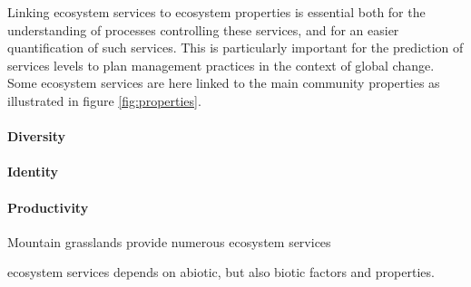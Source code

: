 

Linking ecosystem services to ecosystem properties is essential both for the understanding of processes controlling these services, and for an easier quantification of such services. This is particularly important for the prediction of services levels to plan management practices in the context of global change. Some ecosystem services are here linked to the main community properties as illustrated in figure  \ref{fig:properties}.


\paragraph{Diversity}


\paragraph{Identity}

\paragraph{Productivity}
Mountain grasslands provide numerous ecosystem services 

ecosystem services depends on abiotic, but also biotic factors and properties. 

%

%


